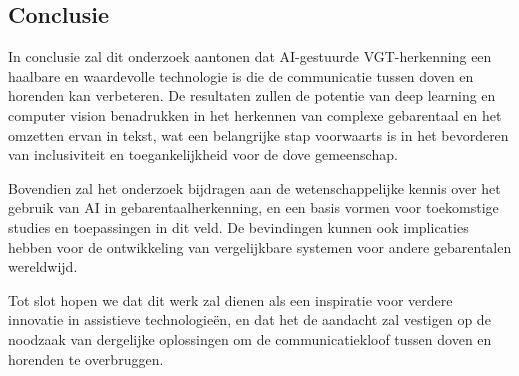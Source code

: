 \subsection{Conclusie} In conclusie zal dit onderzoek aantonen dat AI-gestuurde VGT-herkenning een haalbare en waardevolle technologie is die de communicatie tussen doven en horenden kan verbeteren. De resultaten zullen de potentie van deep learning en computer vision benadrukken in het herkennen van complexe gebarentaal en het omzetten ervan in tekst, wat een belangrijke stap voorwaarts is in het bevorderen van inclusiviteit en toegankelijkheid voor de dove gemeenschap.

Bovendien zal het onderzoek bijdragen aan de wetenschappelijke kennis over het gebruik van AI in gebarentaalherkenning, en een basis vormen voor toekomstige studies en toepassingen in dit veld. De bevindingen kunnen ook implicaties hebben voor de ontwikkeling van vergelijkbare systemen voor andere gebarentalen wereldwijd.

Tot slot hopen we dat dit werk zal dienen als een inspiratie voor verdere innovatie in assistieve technologieën, en dat het de aandacht zal vestigen op de noodzaak van dergelijke oplossingen om de communicatiekloof tussen doven en horenden te overbruggen.